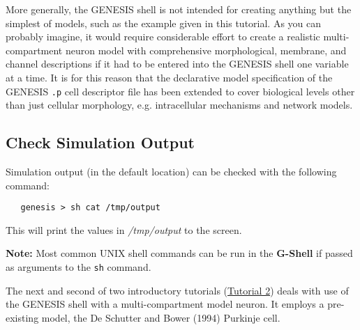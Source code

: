 \documentclass[12pt]{article}
\begin{document}
More generally, the GENESIS shell is not intended for creating anything but the simplest of models, such as the example given in this tutorial.  As you can probably imagine, it would require considerable effort to create a realistic multi-compartment neuron model with comprehensive morphological, membrane, and channel descriptions if it had to be entered into the GENESIS shell one variable at a time. It is for this reason that the declarative model specification of the GENESIS {\tt.p} cell descriptor file has been extended to cover biological levels other than just cellular morphology, e.g. intracellular mechanisms and network models.

\subsection*{Check Simulation Output}

Simulation output (in the default location) can be checked with the following command:
\begin{verbatim}
   genesis > sh cat /tmp/output
\end{verbatim}
This will print the values in {\it /tmp/output} to the screen.

{\bf Note:} Most common UNIX shell commands can be run in the {\bf G-Shell} if passed as arguments to the {\tt sh} command.

The next and second of two introductory tutorials (\href{../tutorial2/tutorial2.tex}{Tutorial 2}) deals with use of the GENESIS shell with a multi-compartment model neuron. It employs a pre-existing model, the De Schutter and Bower (1994) Purkinje cell.
\end{document}
